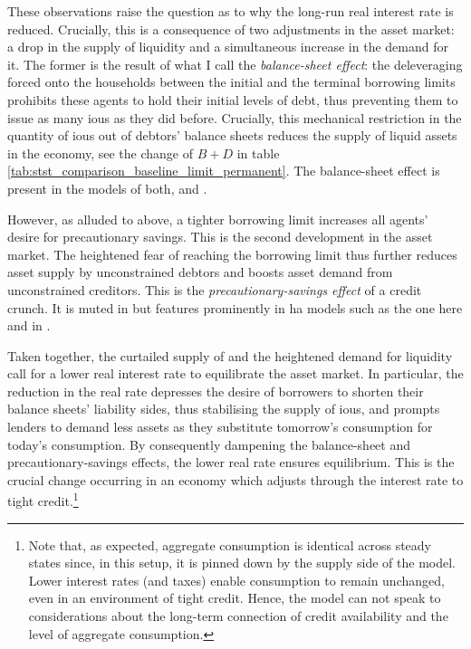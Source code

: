 \documentclass[a4paper,12pt]{article} %
\numberwithin{equation}{section} %
\numberwithin{figure}{section}
\numberwithin{table}{section}
\begin{document}
These observations raise the question as to why the long-run real interest rate is reduced. Crucially, this is a consequence of two adjustments in the asset market: a drop in the supply of liquidity and a simultaneous increase in the demand for it. The former is the result of what I call the \textit{balance-sheet effect}: the deleveraging forced onto the households between the initial and the terminal borrowing limits prohibits these agents to hold their initial levels of debt, thus preventing them to issue as many \Gls{iou}s as they did before. Crucially, this mechanical restriction in the quantity of \Gls{iou}s out of debtors' balance sheets reduces the supply of liquid assets in the economy, see the change of $B + D$ in table \ref{tab:stst_comparison_baseline_limit_permanent}. The balance-sheet effect is present in the models of both, \textcite{egg2012} and \textcite{gl2017}. 

However, as alluded to above, a tighter borrowing limit increases all agents' desire for precautionary savings. This is the second development in the asset market. The heightened fear of reaching the borrowing limit thus further reduces asset supply by unconstrained debtors and boosts asset demand from unconstrained creditors. This is the \textit{precautionary-savings effect} of a credit crunch. It is muted in \textcite{egg2012} but features prominently in \Gls{ha} models such as the one here and in \textcite{gl2017}. 

Taken together, the curtailed supply of and the heightened demand for liquidity call for a lower real interest rate to equilibrate the asset market. In particular, the reduction in the real rate depresses the desire of borrowers to shorten their balance sheets' liability sides, thus stabilising the supply of \Gls{iou}s, and prompts lenders to demand less assets as they substitute tomorrow's consumption for today's consumption. By consequently dampening the balance-sheet and precautionary-savings effects, the lower real rate ensures equilibrium. This is the crucial change occurring in an economy which adjusts through the interest rate to tight credit.\footnote{Note that, as expected, aggregate consumption is identical across steady states since, in this setup, it is pinned down by the supply side of the model. Lower interest rates (and taxes) enable consumption to remain unchanged, even in an environment of tight credit. Hence, the model can not speak to considerations about the long-term connection of credit availability and the level of aggregate consumption.}
\end{document}
